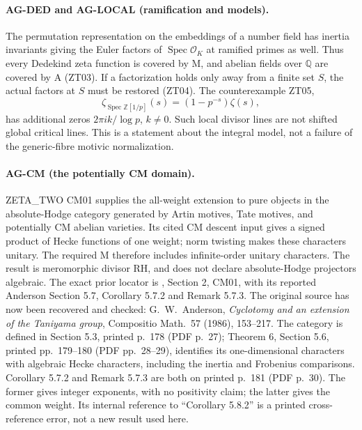 \documentclass[11pt,a4paper]{article}
\begin{document}
\paragraph{AG-DED and AG-LOCAL (ramification and models).}
The permutation representation on the embeddings of a number field has
inertia invariants giving the Euler factors of $\operatorname{Spec}\mathcal
O_K$ at ramified primes as well. Thus every Dedekind zeta function is covered
by M, and abelian fields over $\mathbb Q$ are covered by A (ZT03).
If a factorization holds only away from a finite set $S$, the actual factors
at $S$ must be restored (ZT04). The counterexample ZT05,
\[
 \zeta_{\operatorname{Spec}\mathbb Z[1/p]}(s)
       =(1-p^{-s})\zeta(s),
\]
has additional zeros $2\pi i k/\log p$, $k\ne0$. Such local divisor lines
are not shifted global critical lines. This is a statement about the
integral model, not a failure of the generic-fibre motivic normalization.

\paragraph{AG-CM (the potentially CM domain).}
ZETA\_TWO CM01 supplies the all-weight extension to pure objects in the
absolute-Hodge category generated by Artin motives, Tate motives, and
potentially CM abelian varieties. Its cited CM descent input gives a signed
product of Hecke functions of one weight; norm twisting makes these
characters unitary. The required M therefore includes infinite-order
unitary characters. The result is meromorphic divisor RH, and does not
declare absolute-Hodge projectors algebraic. The exact prior locator is
, Section 2, CM01,
with its reported Anderson Section 5.7, Corollary 5.7.2 and Remark 5.7.3.
The original source has now been recovered and checked: G.~W.~Anderson,
\emph{Cyclotomy and an extension of the Taniyama group}, Compositio
Math.~57 (1986), 153--217. The category is defined in Section 5.3,
printed p.~178 (PDF p.~27); Theorem 6, Section 5.6, printed pp.~179--180
(PDF pp.~28--29), identifies its one-dimensional characters with algebraic
Hecke characters, including the inertia and Frobenius comparisons.
Corollary 5.7.2 and Remark 5.7.3 are both on printed p.~181 (PDF p.~30).
The former gives integer exponents, with no positivity claim; the latter
gives the common weight. Its internal reference to ``Corollary 5.8.2'' is
a printed cross-reference error, not a new result used here.
\end{document}
